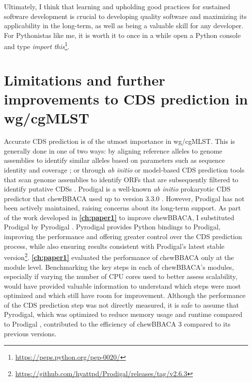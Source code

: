Ultimately, I think that learning and upholding good practices for sustained software development is crucial to developing quality software and maximizing its applicability in the long-term, as well as being a valuable skill for any developer. For Pythonistas like me, it is worth it to once in a while open a Python console and type \textit{import this}\footnote{\url{https://peps.python.org/pep-0020/}}.

\section{Limitations and further improvements to CDS prediction in wg/cgMLST}

Accurate \ac{CDS} prediction is of the utmost importance in \ac{wg/cgMLST}. This is generally done in one of two ways: by aligning reference alleles to genome assemblies to identify similar alleles based on parameters such as sequence identity and coverage \cite{jolley_open-access_2018}; or through \textit{ab initio} or model-based \ac{CDS} prediction tools that scan genome assemblies to identify \ac{ORFs} that are subsequently filtered to identify putative \ac{CDSs} \cite{dimonaco_no_2022}. Prodigal is a well-known \textit{ab initio} prokaryotic \ac{CDS} predictor that chewBBACA used up to version 3.3.0 \cite{hyatt_prodigal_2010, silva_chewbbaca_2018}. However, Prodigal has not been actively maintained, raising concerns about its long-term support. As part of the work developed in \textbf{\autoref{ch:paper1}} to improve chewBBACA, I substituted Prodigal by Pyrodigal \cite{larralde_pyrodigal_2022}. Pyrodigal provides Python bindings to Prodigal, improving the performance and offering greater control over the \ac{CDS} prediction process, while also ensuring results consistent with Prodigal's latest stable version\footnote{\url{https://github.com/hyattpd/Prodigal/releases/tag/v2.6.3}}. \textbf{\autoref{ch:paper1}} evaluated the performance of chewBBACA only at the module level. Benchmarking the key steps in each of chewBBACA's modules, especially if varying the number of \ac{CPU} cores used to better assess scalability, would have provided valuable information to understand which steps were most optimized and which still have room for improvement. Although the performance of the \ac{CDS} prediction step was not directly measured, it is safe to assume that Pyrodigal, which was optimized to reduce memory usage and runtime compared to Prodigal \cite{larralde_pyrodigal_2022}, contributed to the efficiency of chewBBACA 3 compared to its previous versions.

